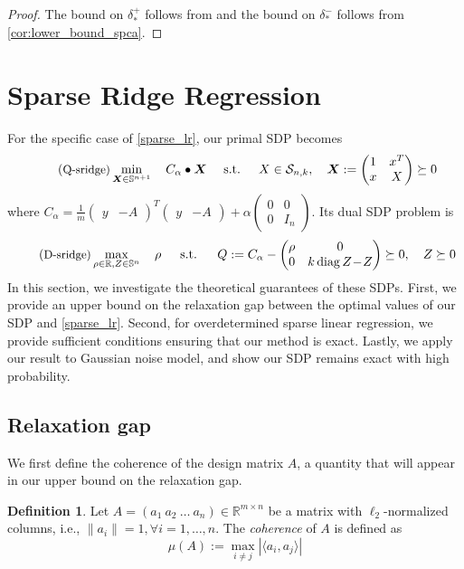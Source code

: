 \documentclass[11pt]{amsart}
\newcommand{\Szero}[2]{\ensuremath{\mathcal{S}_{#1,#2}}}
\theoremstyle{plain}
\theoremstyle{definition}
\newtheorem{dfn}[thm]{Definition}
\theoremstyle{remark}
\newcommand{\RR}{\mathbb{R}}
\newcommand{\st}{\text{\, s.t.\, }}
\newcommand{\X}{\boldsymbol{X}}
\DeclareMathOperator{\diag}{diag}
\begin{document}
	\begin{proof}
		The bound on $\delta^+_*$ follows from 
		and the bound on $\delta^-_*$ follows from \cref{cor:lower_bound_spca}.
	\end{proof}
	
	\section{Sparse Ridge Regression}\label{section:ridge}
	
	For the specific case of \eqref{sparse_lr},
	our primal SDP becomes
	\begin{equation}\label{sdp_slr}
		\tag{\small{Q-sridge}}
		\min_{\X \in \mathbb{S}^{n+1}} \quad C_\alpha \bullet \X
		\quad\text{ s.t. }\quad
		X \in \Szero{n}{k},\quad
		\X := \begin{pmatrix}
			1 & x^T\\
			x & X
		\end{pmatrix}\succeq 0
	\end{equation}
	where $C_\alpha = \frac{1}{m}\begin{pmatrix}
		y & -A
	\end{pmatrix}^T\begin{pmatrix}
		y & -A
	\end{pmatrix} + \alpha \begin{pmatrix}
		0 & 0\\
		0 & I_n
	\end{pmatrix}.$
	Its dual SDP problem is
	\begin{equation}\label{sdp_slr_dual}
		\tag{\small{D-sridge}}
		\max_{\rho\in\RR, Z\in \mathbb{S}^{n}}\quad  \rho
		\quad\st\quad
		Q := C_\alpha
		-\begin{pmatrix}
			\rho & 0\\
			0 & k\diag Z \!-\! Z
		\end{pmatrix} \succeq 0,\quad
		Z \succeq 0
	\end{equation}
	In this section, we investigate the theoretical guarantees of these SDPs.
	First, we provide an upper bound on the relaxation gap between the optimal values of our SDP and \eqref{sparse_lr}. Second, for overdetermined sparse linear regression, we provide sufficient conditions ensuring that our method is exact.
	Lastly, we apply our result to Gaussian noise model, and show our SDP remains exact with high probability.
	
	\subsection{Relaxation gap} 
	We first define the coherence of the design matrix \(A\), a quantity that will appear in our upper bound on the relaxation gap.
	\begin{dfn}
		Let $A = (a_1~a_2~\dots~a_n) \in \RR^{m\times n}$ be a matrix with $\ell_2$-normalized columns, i.e., $\|a_i\|=1,\forall i=1,\dots,n$. The \textit{coherence} of $A$ is defined as 
		\[
		\mu(A) := \max_{i\neq j} |\langle a_i, a_j \rangle|
		\]
	\end{dfn}
	
\end{document}
